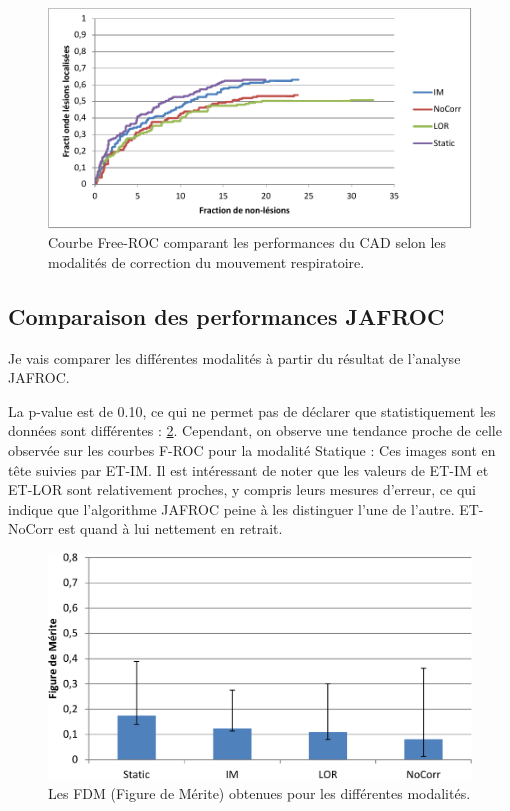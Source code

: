 \begin{figure}[h!]
 \begin{center}
   \includegraphics[width=13cm]{images/FROC_mod}
 \end{center}
 \caption{Courbe Free-ROC comparant les performances du CAD selon les modalités de correction du mouvement respiratoire.}
 \label{fig:froc_mod}
\end{figure}


\subsection{Comparaison des performances JAFROC}

Je vais comparer les différentes modalités à partir du résultat de l'analyse JAFROC.

La p-value est de 0.10, ce qui ne permet pas de déclarer que statistiquement les données sont différentes : \ref{fig:fom_mod}. Cependant, on observe une tendance proche de celle observée sur les courbes F-ROC pour la modalité Statique : Ces images sont en tête suivies par ET-IM. Il est intéressant de noter que les valeurs de ET-IM et ET-LOR sont relativement proches, y compris leurs mesures d'erreur, ce qui indique que l'algorithme JAFROC peine à les distinguer l'une de l'autre. ET-NoCorr est quand à lui nettement en retrait. 

\begin{figure}[h!]
 \begin{center}
   \includegraphics[width=13cm]{images/FOM_mod}
 \end{center}
 \caption{Les FDM (Figure de Mérite) obtenues pour les différentes modalités.}
 \label{fig:fom_mod}
\end{figure}

